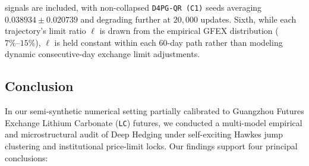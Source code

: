 \documentclass[11pt,a4paper]{article}
\begin{document}
signals are included, with non-collapsed \texttt{D4PG-QR (C1)} seeds averaging $0.038934 \pm 0.020739$ and degrading further at $20,000$ updates. Sixth, while each trajectory's limit ratio $\ell$ is drawn from the empirical GFEX distribution ($7\%\text{--}15\%$), $\ell$ is held constant within each 60-day path rather than modeling dynamic consecutive-day exchange limit adjustments.

\subsection{Conclusion}
\label{sec:conclusion}
In our semi-synthetic numerical setting partially calibrated to Guangzhou Futures Exchange Lithium Carbonate (\texttt{LC}) futures, we conducted a multi-model empirical and microstructural audit of Deep Hedging under self-exciting Hawkes jump clustering and institutional price-limit locks. Our findings support four principal conclusions:
\end{document}
